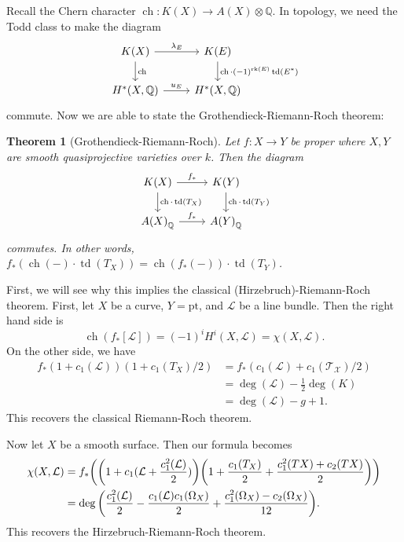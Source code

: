\documentclass[leqno, openany]{memoir}
\newtheorem{thm}{Theorem}[section]
\theoremstyle{definition}
\theoremstyle{remark}
\theoremstyle{plain}
\theoremstyle{definition}
\theoremstyle{remark}
\newcommand{\Q}{\mathbb{Q}}
\newcommand{\mc}[1]{\mathcal{#1}}
\newcommand{\mr}[1]{\mathrm{#1}}
\DeclareMathOperator{\ch}{ch}
\DeclareMathOperator{\td}{td}
\begin{document}
Recall the Chern character $\ch \colon K(X) \to A(X) \otimes \Q$. In topology,
we need the Todd class to make the diagram \begin{equation*} \begin{tikzcd}
    K(X) \ar{r}{\lambda_E} \ar{d}{\ch} & K(E) \ar{d}{\ch \cdot
    {(-1)}^{\mr{rk}(E)} \td(E^*)} \\ H^*(X, \Q) \ar{r}{u_E} & H^*(X, \Q)
\end{tikzcd} \end{equation*} commute. Now we are able to state the
Grothendieck-Riemann-Roch theorem:

\begin{thm}[Grothendieck-Riemann-Roch] Let $f \colon X \to Y$ be proper where
    $X, Y$ are smooth quasiprojective varieties over $k$. Then the diagram
    \begin{equation*} \begin{tikzcd} K(X) \ar{r}{f_*} \ar{d}{\ch \cdot
        \td(T_X)} & K(Y) \ar{d}{\ch \cdot \td(T_Y)} \\ {A(X)}_{\Q} \ar{r}{f_*}
                  & {A(Y)}_{\Q} \end{tikzcd} \end{equation*} commutes. In other
              words, $f_*(\ch(-) \cdot \td(T_X)) = \ch(f_*(-)) \cdot \td(T_Y)$.
          \end{thm}

First, we will see why this implies the classical (Hirzebruch)-Riemann-Roch
theorem. First, let $X$ be a curve, $Y = \mr{pt}$, and $\mc{L}$ be a line
bundle. Then the right hand side is \[ \ch(f_* [\mc{L}]) = {(-1)}^i H^i(X,
\mc{L}) = \chi(X, \mc{L}). \] On the other side, we have \begin{align*} f_* (1
+ c_1(\mc{L})) ( 1 + c_1(T_X)/2 ) &= f_*(c_1(\mc{L}) + c_1(\mc{T_X})/2) \\ &=
\deg(\mc{L}) - \frac{1}{2} \deg(K) \\ &= \deg(\mc{L}) - g + 1.  \end{align*}
This recovers the classical Riemann-Roch theorem.

Now let $X$ be a smooth surface. Then our formula becomes \begin{align*}
    \chi(X, \mc{L}) &= f_* \qty( \qty(1 + c_1(\mc{L} +
    \frac{c_1^2(\mc{L})}{2})) \qty(1 + \frac{c_1(T_X)}{2} + \frac{c_1^2(TX) +
c_2(TX)}{2}) ) \\ &= \deg \qty( \frac{c_1^2(\mc{L})}{2} - \frac{c_1(\mc{L})
c_1(\Omega_X)}{2} + \frac{c_1^2(\Omega_X) - c_2(\Omega_X)}{12} ).  \end{align*}
This recovers the Hirzebruch-Riemann-Roch theorem.
\end{document}
